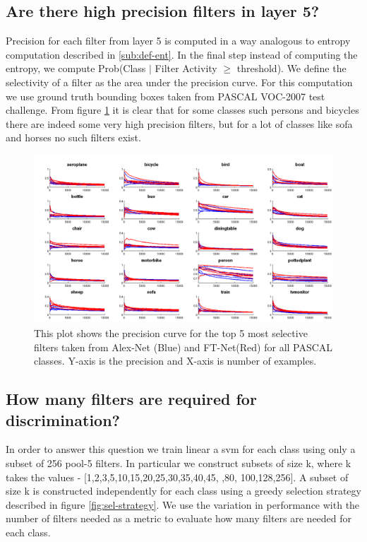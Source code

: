 \subsection{Are there high precision filters in layer 5?}
\label{sub:class-specific-unit}
Precision for each filter from layer 5 is computed in a way analogous to entropy computation described in \ref{sub:def-ent}. In the final step instead of computing the entropy, we compute Prob(Class $|$ Filter Activity $\geq$ threshold). We define the selectivity of a filter as the area under the precision curve. For this computation we use ground truth bounding boxes taken from PASCAL VOC-2007 test challenge.
From figure \ref{fig:prob-sel} it is clear that for some classes such persons and bicycles there are indeed some very high precision filters, but for a lot of classes like sofa and horses no such filters exist. 

\begin{figure}[t!]
\centering
\includegraphics[scale=0.20]{images/prob_sel_dims_top5.png}
\caption{This plot shows the precision curve for the top 5 most selective filters taken from Alex-Net (Blue) and FT-Net(Red) for all PASCAL classes. Y-axis is the precision and X-axis is number of examples.}
\label{fig:prob-sel}
\end{figure}

\subsection{How many filters are required for discrimination?}
\label{sub:how-many}
In order to answer this question we train linear a svm for each class using only a subset of 256 pool-5 filters. In particular we construct subsets of size k, where k takes the values - [1,2,3,5,10,15,20,25,30,35,40,45, ,80, 100,128,256]. A subset of size k is constructed independently for each class using a greedy selection strategy described in figure \ref{fig:sel-strategy}. We use the variation in performance with the number of filters needed as a metric to evaluate how many filters are needed for each class. 
  
